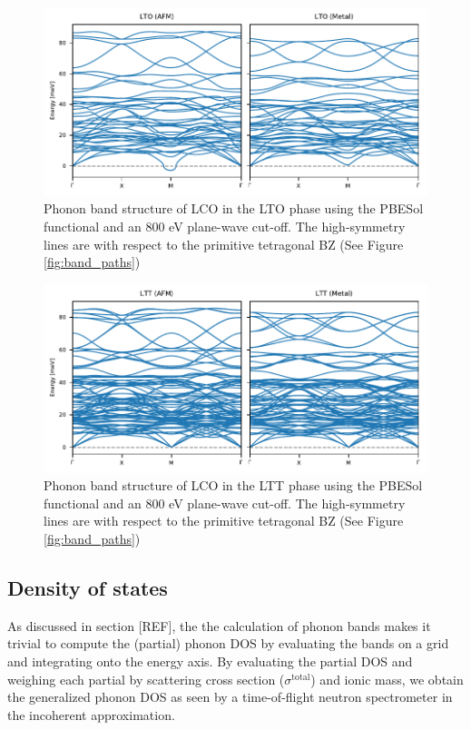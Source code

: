 \begin{figure}
	\centering
	\includegraphics[width=\textwidth]{fig/simulation/lto_bands.pdf}
	\caption[LTO Bands]{Phonon band structure of LCO in the LTO phase using the PBESol functional and an 800 eV plane-wave cut-off. The high-symmetry lines are with respect to the primitive tetragonal BZ (See Figure \ref{fig:band_paths})}
	\label{fig:lto_bands}
\end{figure}

\begin{figure}
	\centering
	\includegraphics[width=\textwidth]{fig/simulation/ltt_bands.pdf}
	\caption[LTT Bands]{Phonon band structure of LCO in the LTT phase using the PBESol functional and an 800 eV plane-wave cut-off. The high-symmetry lines are with respect to the primitive tetragonal BZ (See Figure \ref{fig:band_paths})}
	\label{fig:ltt_bands}
\end{figure}

\subsection{Density of states}\label{sec:sim_dos}
As discussed in section [REF], the the calculation of phonon bands makes it trivial to compute the (partial) phonon DOS by evaluating the bands on a grid and integrating onto the energy axis. By evaluating the partial DOS and weighing each partial by scattering cross section ($\sigma^\text{total}$) and ionic mass, we obtain the generalized phonon DOS as seen by a time-of-flight neutron spectrometer in the incoherent approximation. 

